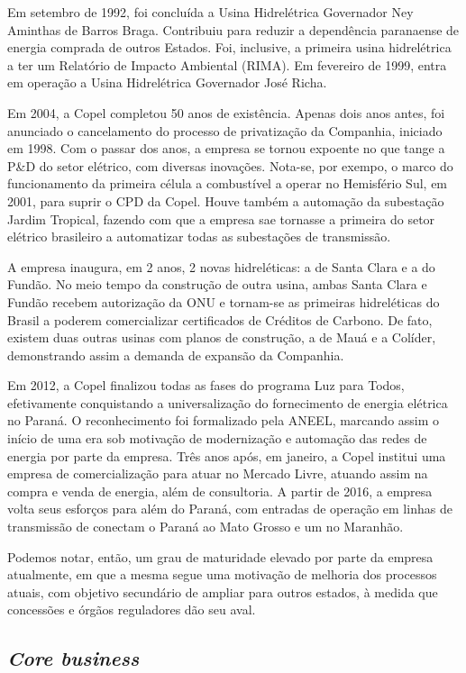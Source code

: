 \documentclass[grad,numbers]{coppe}
\begin{document}
  Em setembro de 1992, foi concluída a Usina Hidrelétrica Governador Ney Aminthas de Barros Braga. Contribuiu para reduzir a dependência paranaense de energia comprada de outros Estados. Foi, inclusive, a primeira usina hidrelétrica a ter um Relatório de Impacto Ambiental (RIMA). Em fevereiro de 1999, entra em operação a Usina Hidrelétrica Governador José Richa.

  Em 2004, a Copel completou 50 anos de existência. Apenas dois anos antes, foi anunciado o cancelamento do processo de privatização da Companhia, iniciado em 1998. Com o passar dos anos, a empresa se tornou expoente no que tange a P\&D do setor elétrico, com diversas inovações. Nota-se, por exempo, o marco do funcionamento da primeira célula a combustível a operar no Hemisfério Sul, em 2001, para suprir o CPD da Copel. Houve também a automação da subestação Jardim Tropical, fazendo com que a empresa sae tornasse a primeira do setor elétrico brasileiro a automatizar todas as subestações de transmissão.

  A empresa inaugura, em 2 anos, 2 novas hidreléticas: a de Santa Clara e a do Fundão. No meio tempo da construção de outra usina, ambas Santa Clara e Fundão recebem autorização da ONU e tornam-se as primeiras hidreléticas do Brasil a poderem comercializar certificados de Créditos de Carbono. De fato, existem duas outras usinas com planos de construção, a de Mauá e a Colíder, demonstrando assim a demanda de expansão da Companhia.

  Em 2012, a Copel finalizou todas as fases do programa Luz para Todos, efetivamente conquistando a universalização do fornecimento de energia elétrica no Paraná. O reconhecimento foi formalizado pela ANEEL, marcando assim o início de uma era sob motivação de modernização e automação das redes de energia por parte da empresa. Três anos após, em janeiro, a Copel institui uma empresa de comercialização para atuar no Mercado Livre, atuando assim na compra e venda de energia, além de consultoria. A partir de 2016, a empresa volta seus esforços para além do Paraná, com entradas de operação em linhas de transmissão de conectam o Paraná ao Mato Grosso e um no Maranhão.

  Podemos notar, então, um grau de maturidade elevado por parte da empresa atualmente, em que a mesma segue uma motivação de melhoria dos processos atuais, com objetivo secundário de ampliar para outros estados, à medida que concessões e órgãos reguladores dão seu aval.

  \hypertarget{core-business}{%
  \subsection{\texorpdfstring{\emph{Core business}}{Core business}}\label{core-business}}
\end{document}
